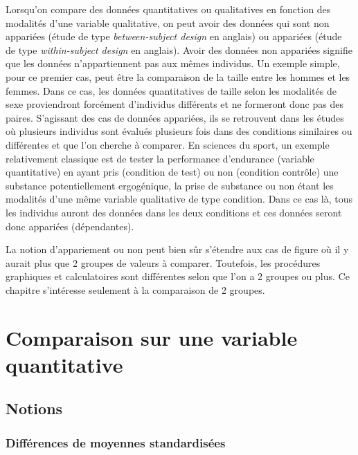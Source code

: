 \documentclass[
  letterpaper,
]{book}
\begin{document}
Lorsqu'on compare des données quantitatives ou qualitatives en fonction
des modalités d'une variable qualitative, on peut avoir des données qui
sont non appariées (étude de type \emph{between-subject design} en
anglais) ou appariées (étude de type \emph{within-subject design} en
anglais). Avoir des données non appariées signifie que les données
n'appartiennent pas aux mêmes individus. Un exemple simple, pour ce
premier cas, peut être la comparaison de la taille entre les hommes et
les femmes. Dans ce cas, les données quantitatives de taille selon les
modalités de sexe proviendront forcément d'individus différents et ne
formeront donc pas des paires. S'agissant des cas de données appariées,
ils se retrouvent dans les études où plusieurs individus sont évalués
plusieurs fois dans des conditions similaires ou différentes et que l'on
cherche à comparer. En sciences du sport, un exemple relativement
classique est de tester la performance d'endurance (variable
quantitative) en ayant pris (condition de test) ou non (condition
contrôle) une substance potentiellement ergogénique, la prise de
substance ou non étant les modalités d'une même variable qualitative de
type condition. Dans ce cas là, tous les individus auront des données
dans les deux conditions et ces données seront donc appariées
(dépendantes).

La notion d'appariement ou non peut bien sûr s'étendre aux cas de figure
où il y aurait plus que 2 groupes de valeurs à comparer. Toutefois, les
procédures graphiques et calculatoires sont différentes selon que l'on a
2 groupes ou plus. Ce chapitre s'intéresse seulement à la comparaison de
2 groupes.

\section{Comparaison sur une variable
quantitative}\label{comparaison-sur-une-variable-quantitative}

\subsection{Notions}\label{notions}

\subsubsection{Différences de moyennes
standardisées}\label{diffuxe9rences-de-moyennes-standardisuxe9es}
\end{document}
